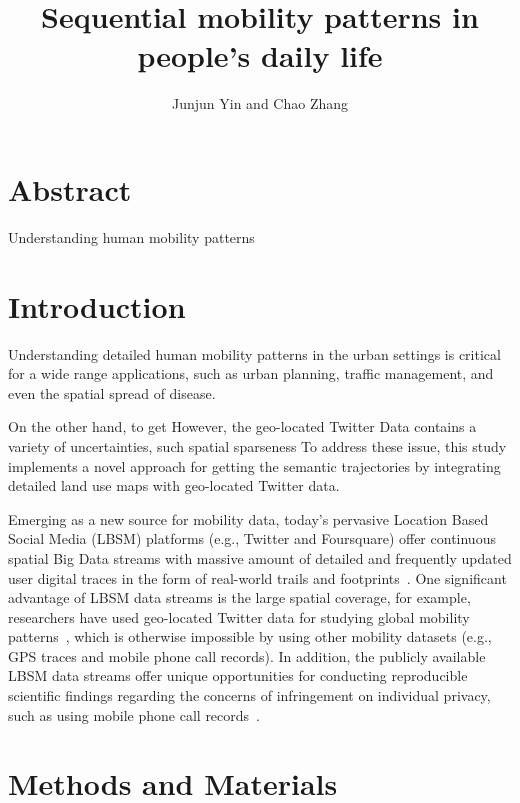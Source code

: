 \documentclass[a4paper,11pt]{article}
\begin{document}
\title{Sequential mobility patterns in people's daily life}
\author{Junjun Yin and Chao Zhang}
\maketitle

\section*{Abstract}
Understanding human mobility patterns 


\section*{Introduction}
Understanding detailed human mobility patterns in the urban settings is critical for a wide range applications, such as urban planning, traffic management, and even the spatial spread of disease.

On the other hand, to get 
However, the geo-located Twitter Data contains a variety of uncertainties, such spatial sparseness
To address these issue, this study implements a novel approach for getting the semantic trajectories by integrating detailed land use maps with geo-located Twitter data.

Emerging as a new source for mobility data, today's pervasive Location Based Social Media (LBSM) platforms (e.g., Twitter and Foursquare) offer continuous spatial Big Data streams with massive amount of detailed and frequently updated user digital traces in the form of real-world trails and footprints~\cite{thatcher2014}.
One significant advantage of LBSM data streams is the large spatial coverage, for example, researchers have used geo-located Twitter data for studying global mobility patterns~\cite{hawelka2014geo}, which is otherwise impossible by using other mobility datasets (e.g., GPS traces and mobile phone call records). 
In addition, the publicly available LBSM data streams offer unique opportunities for conducting reproducible scientific findings regarding the concerns of infringement on individual privacy, such as using mobile phone call records~\cite{giannotti2008mobility,crampton2014collect,Jurdak2015}.




\section*{Methods and Materials}
\end{document}
